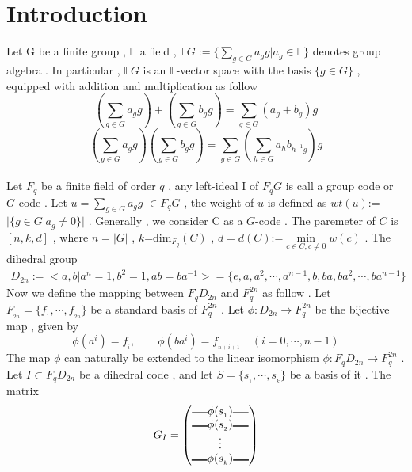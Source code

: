 \documentclass{article}
\begin{document}
\section{Introduction}
Let G be a finite group , $\mathbb{F}$ a field , $\mathbb{F}G:=\{\sum_{g\in{G}}a_gg|a_g\in{\mathbb{F}}\}$ denotes group algebra . In particular , $\mathbb{F}G$ is an $\mathbb{F}$-vector space with the basis $\{g\in{G}\}$ , equipped with addition and multiplication as follow
\begin{equation*}
  (\sum_{g\in{G}}a_gg)+(\sum_{g\in{G}}b_gg)=\sum_{g\in{G}}(a_g+b_g)g
\end{equation*}
\begin{equation*}
  (\sum_{g\in{G}}a_gg)(\sum_{g\in{G}}b_gg)=\sum_{g\in{G}}(\sum_{h\in{G}}a_hb_{h^{-1}g})g
\end{equation*}\\
Let $F_q$ be a finite field of order $q$ , any left-ideal I of $F_qG$ is call a group code or $G$-code . Let $u={\sum\limits_{g\in{G}}a_gg}$ $\in{F_qG}$ , the weight of $u$ is defined as $wt(u)$:=$|\{g\in{G}|a_g\neq{0}\}|$ . Generally , we consider C as a $G$-code . The paremeter of $C$ is $[n,k,d]$ , where $n=|G|$ , $k$=dim$_{F_q}(C)$ , $d=d(C)$:=$\mathop{min}\limits_{c\in{C},c\neq{0}}w(c)$ . The dihedral group
\begin{align*}
   D_{2n}:=< a,b|a^{n}=1,b^{2}=1,ab=ba^{-1}>
   =\{e,a,a^{2},\cdots,a^{n-1},b,ba,ba^{2},\cdots,ba^{n-1}\}
   \end{align*}
Now we define the mapping between $F_qD_{2n}$ and $F_q^{2n}$ as follow . Let $F_{_{2n}}=\{f_{_1},\cdots,f_{_{2n}}\}$ be a standard basis of $F_{q}^{2n}$ . Let $\phi:D_{2n}\rightarrow F_q^{2n}$ be the bijective map , given by 
\begin{equation}
    \phi(a^{i})=f_{_{i}},\qquad\phi(ba^{i})=f_{_{n+i+1}}\quad(i=0,\cdots,n-1)
    \end{equation}
The map $\phi$ can naturally be extended to the linear isomorphism $\phi:F_qD_{2n}\rightarrow F_q^{2n}$ . Let $I\subset F_qD_{2n}$ be a dihedral code , and let $S=\{s_{_1},\cdots,s_{_k}\}$ be a basis of it . The matrix 
\begin{equation*}
    G_{I}=\begin{pmatrix}
        \rule[1pt]{0.5cm}{0.1em}\phi(s_{_1})\rule[1pt]{0.5cm}{0.1em}\\
        \rule[1pt]{0.5cm}{0.1em}\phi(s_{_2})\rule[1pt]{0.5cm}{0.1em}\\
        \vdots\\
        \rule[1pt]{0.5cm}{0.1em}\phi(s_{_k})\rule[1pt]{0.5cm}{0.1em}
    \end{pmatrix}
\end{equation*}
\end{document}
